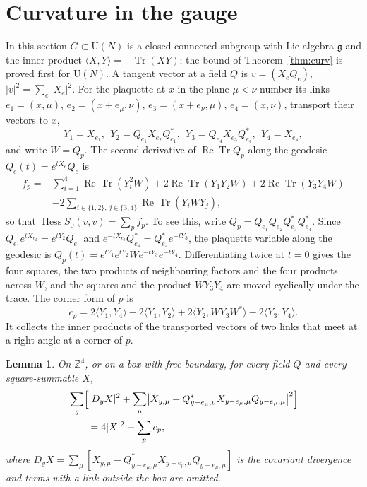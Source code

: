 \documentclass[11pt]{amsart}
\newtheorem{lemma}[theorem]{Lemma}
\theoremstyle{definition}
\theoremstyle{remark}
\numberwithin{equation}{section}
\newcommand{\Z}{\mathbb{Z}}
\newcommand{\U}{\mathrm{U}}
\newcommand{\g}{\mathfrak{g}}
\newcommand{\Tr}{\operatorname{Tr}}
\newcommand{\ReTr}{\operatorname{Re}\operatorname{Tr}}
\newcommand{\Hess}{\operatorname{Hess}}
\newcommand{\ip}[2]{\langle #1,#2\rangle}
\begin{document}
\section{Curvature in the gauge}\label{sec:curvature}

In this section $G\subset\U(N)$ is a closed connected subgroup with Lie
algebra $\g$ and the inner product $\ip XY=-\Tr(XY)$; the bound of
Theorem~\ref{thm:curv} is proved first for $\U(N)$. A tangent vector at a field $Q$ is $v=(X_eQ_e)$,
$|v|^2=\sum_e|X_e|^2$. For the plaquette at $x$ in the plane $\mu<\nu$ number
its links $e_1=(x,\mu)$, $e_2=(x+e_\mu,\nu)$, $e_3=(x+e_\nu,\mu)$,
$e_4=(x,\nu)$, transport their vectors to $x$,
\begin{equation}\label{eq:transport}
Y_1=X_{e_1},\ \ Y_2=Q_{e_1}X_{e_2}Q_{e_1}^*,\ \
Y_3=Q_{e_4}X_{e_3}Q_{e_4}^*,\ \ Y_4=X_{e_4},
\end{equation}
and write $W=Q_p$. The second derivative of $\ReTr Q_p$ along the geodesic
$Q_e(t)=e^{tX_e}Q_e$ is
\begin{equation}\label{eq:fp}
\begin{split}
f_p={}&\sum_{i=1}^4\ReTr(Y_i^2W)+2\ReTr(Y_1Y_2W)+2\ReTr(Y_3Y_4W)\\
&-2\sum_{i\in\{1,2\},\,j\in\{3,4\}}\ReTr(Y_iWY_j),
\end{split}
\end{equation}
so that $\Hess S_0(v,v)=\sum_pf_p$. To see this, write $Q_p=Q_{e_1}Q_{e_2}Q_{e_3}^*Q_{e_4}^*$. Since
$Q_{e_1}e^{tX_{e_2}}=e^{tY_2}Q_{e_1}$ and $e^{-tX_{e_3}}Q_{e_4}^*=Q_{e_4}^*
e^{-tY_3}$, the plaquette variable along the geodesic is
$Q_p(t)=e^{tY_1}e^{tY_2}We^{-tY_3}e^{-tY_4}$. Differentiating twice at $t=0$
gives the four squares, the two products of neighbouring factors and the four
products across $W$, and the squares and the product $WY_3Y_4$ are moved
cyclically under the trace. The corner form of $p$ is
\begin{equation}\label{eq:corner}
c_p=2\ip{Y_1}{Y_4}-2\ip{Y_1}{Y_2}+2\ip{Y_2}{WY_3W^*}-2\ip{Y_3}{Y_4}.
\end{equation}
It collects the inner products of the transported vectors of two links that
meet at a right angle at a corner of $p$.

\begin{lemma}\label{lem:identity}
On $\Z^4$, or on a box with free boundary, for every field $Q$ and every
square-summable $X$,
\[
\begin{split}
&\sum_y\Bigl[|D_yX|^2+\sum_\mu\bigl|X_{y,\mu}+Q^*_{y-e_\mu,\mu}X_{y-e_\mu,\mu}
Q_{y-e_\mu,\mu}\bigr|^2\Bigr]\\
&\qquad=4|X|^2+\sum_pc_p ,
\end{split}
\]
where $D_yX=\sum_\mu[X_{y,\mu}-Q^*_{y-e_\mu,\mu}X_{y-e_\mu,\mu}Q_{y-e_\mu,\mu}]$ is
the covariant divergence and terms with a link outside the box are omitted.
\end{lemma}
\end{document}
